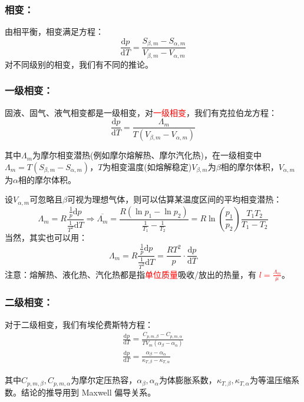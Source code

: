 \documentclass[zihao=5,UTF8]{report}
\begin{document}
\subsubsection{相变：}
由相平衡，相变满足方程：
\begin{equation}
    \frac{\mathrm{d}p}{\mathrm{d}T} = \frac{S_{\beta,m} - S_{\alpha,m}}{V_{\beta,m}-V_{\alpha,m}}
\end{equation}
对不同级别的相变，我们有不同的推论。
\subsubsection{一级相变：}
固液、固气、液气相变都是一级相变，对\textcolor{red}{一级相变}，我们有克拉伯龙方程：
\begin{equation}
    \frac{\mathrm{d} p}{\mathrm{d}T} = \frac{\Lambda_m}{T(V_{\beta,m}-V_{\alpha,m})}
\end{equation}
{\par\color{gray}\small
其中$\Lambda_m$为摩尔相变潜热(例如摩尔熔解热、摩尔汽化热)，在一级相变中$\Lambda_m = T(S_{\beta,m} - S_{\alpha,m})$，$T$为相变温度(如熔解稳定)$V_{\beta,m}$为$\beta$相的摩尔体积，$V_{\alpha,m}$为$\alpha$相的摩尔体积。\par
设$V_{\alpha,m}$可忽略且$\beta$可视为理想气体，则可以估算某温度区间的平均相变潜热：
\begin{equation*}
    \Lambda_m = R\frac{\frac{1}{p}\mathrm{d}p}{\frac{1}{T^2}\mathrm{d}T}\Longrightarrow \overline{\Lambda_m} = \frac{R(\ln p_1 - \ln p_2)}{\frac{1}{T_1} - \frac{1}{T_2}} =  R\ln(\frac{p_1}{p_2})\frac{T_1T_2}{T_1 - T_2}
\end{equation*}
当然，其实也可以用：
\begin{equation*}
    \Lambda_m = R\frac{\frac{1}{p}\mathrm{d}p}{\frac{1}{T^2}\mathrm{d}T} = \frac{RT^2}{p}\cdot \frac{\mathrm{d}p}{\mathrm{d}T}
\end{equation*}
注意：熔解热、液化热、汽化热都是指\textcolor{red}{单位质量}吸收/放出的热量，有 \textcolor{red}{ $l = \frac{\Lambda_m}{\mu}$}。
\par}

\subsubsection{二级相变：}
对于二级相变，我们有埃伦费斯特方程：
\begin{gather}
    \frac{\mathrm{d} p}{\mathrm{d}T} = \frac{C_{p,m,\beta} - C_{p,m,\alpha}}{TV_m(\alpha_\beta - \alpha_\alpha)}\\
    \frac{\mathrm{d} p}{\mathrm{d}T} = \frac{\alpha_\beta - \alpha_\alpha}{\kappa_{T,\beta} - \kappa_{T,\alpha}}
\end{gather}
{\par\color{gray}\small
其中$C_{p,m,\beta}, C_{p,m,\alpha}$为摩尔定压热容，$\alpha_\beta, \alpha_\alpha$为体膨胀系数，$\kappa_{T,\beta}, \kappa_{T,\alpha}$为等温压缩系数。结论的推导用到 Maxwell 偏导关系。
\par}
\end{document}
